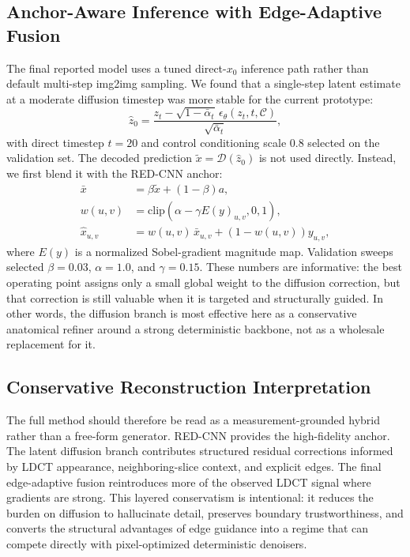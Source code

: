 \documentclass{article}
\begin{document}
\subsection{Anchor-Aware Inference with Edge-Adaptive Fusion}
The final reported model uses a tuned direct-$x_0$ inference path rather than default multi-step img2img sampling. We found that a single-step latent estimate at a moderate diffusion timestep was more stable for the current prototype:
\begin{equation}
    \hat{z}_0 =
    \frac{z_t - \sqrt{1-\bar{\alpha}_t}\,\epsilon_{\theta}(z_t,t,\mathcal{C})}
    {\sqrt{\bar{\alpha}_t}},
\end{equation}
with direct timestep $t=20$ and control conditioning scale $0.8$ selected on the validation set. The decoded prediction $\tilde{x} = \mathcal{D}(\hat{z}_0)$ is not used directly. Instead, we first blend it with the RED-CNN anchor:
\begin{align}
    \bar{x} &= \beta \tilde{x} + (1-\beta) a, \\
    w(u,v) &= \mathrm{clip}\!\left(\alpha - \gamma E(y)_{u,v}, 0, 1\right), \\
    \hat{x}_{u,v} &= w(u,v)\,\bar{x}_{u,v} + \left(1-w(u,v)\right) y_{u,v},
\end{align}
where $E(y)$ is a normalized Sobel-gradient magnitude map. Validation sweeps selected $\beta = 0.03$, $\alpha = 1.0$, and $\gamma = 0.15$. These numbers are informative: the best operating point assigns only a small global weight to the diffusion correction, but that correction is still valuable when it is targeted and structurally guided. In other words, the diffusion branch is most effective here as a conservative anatomical refiner around a strong deterministic backbone, not as a wholesale replacement for it.

\subsection{Conservative Reconstruction Interpretation}
The full method should therefore be read as a measurement-grounded hybrid rather than a free-form generator. RED-CNN provides the high-fidelity anchor. The latent diffusion branch contributes structured residual corrections informed by LDCT appearance, neighboring-slice context, and explicit edges. The final edge-adaptive fusion reintroduces more of the observed LDCT signal where gradients are strong. This layered conservatism is intentional: it reduces the burden on diffusion to hallucinate detail, preserves boundary trustworthiness, and converts the structural advantages of edge guidance into a regime that can compete directly with pixel-optimized deterministic denoisers.
\end{document}
